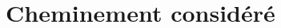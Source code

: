 \documentclass[10pt, french]{article}
\begin{document}
\section*{Cheminement considéré}

\begin{multicols*}{2}

\end{multicols*}
\end{document}

